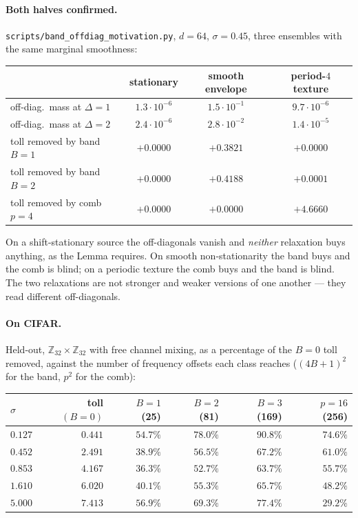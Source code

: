 \paragraph{Both halves confirmed.} \texttt{scripts/band\_offdiag\_motivation.py},
$d=64$, $\sigma=0.45$, three ensembles with the same marginal smoothness:

\begin{center}
\begin{tabular}{lccc}
\hline
 & stationary & smooth envelope & period-$4$ texture\\
\hline
off-diag.\ mass at $\Delta=1$ & $1.3\cdot10^{-6}$ & $1.5\cdot10^{-1}$ & $9.7\cdot10^{-6}$\\
off-diag.\ mass at $\Delta=2$ & $2.4\cdot10^{-6}$ & $2.8\cdot10^{-2}$ & $1.4\cdot10^{-5}$\\
toll removed by band $B=1$ & $+0.0000$ & $\mathbf{+0.3821}$ & $+0.0000$\\
toll removed by band $B=2$ & $+0.0000$ & $\mathbf{+0.4188}$ & $+0.0001$\\
toll removed by comb $p=4$ & $+0.0000$ & $+0.0000$ & $\mathbf{+4.6660}$\\
\hline
\end{tabular}
\end{center}

On a shift-stationary source the off-diagonals vanish and \emph{neither} relaxation buys
anything, as the Lemma requires. On smooth non-stationarity the band buys and the comb
is blind; on a periodic texture the comb buys and the band is blind. The two relaxations
are not stronger and weaker versions of one another --- they read different off-diagonals.

\paragraph{On CIFAR.} Held-out, $\mathbb{Z}_{32}\times\mathbb{Z}_{32}$ with free channel
mixing, as a percentage of the $B=0$ toll removed, against the number of frequency
offsets each class reaches ($(4B+1)^{2}$ for the band, $p^{2}$ for the comb):

\begin{center}
\begin{tabular}{lrrrrr}
\hline
$\sigma$ & toll $(B{=}0)$ & $B{=}1$ (25) & $B{=}2$ (81) & $B{=}3$ (169) & $p{=}16$ (256)\\
\hline
$0.127$ & $0.441$ & $54.7\%$ & $78.0\%$ & $90.8\%$ & $74.6\%$\\
$0.452$ & $2.491$ & $38.9\%$ & $56.5\%$ & $67.2\%$ & $61.0\%$\\
$0.853$ & $4.167$ & $36.3\%$ & $52.7\%$ & $63.7\%$ & $55.7\%$\\
$1.610$ & $6.020$ & $40.1\%$ & $55.3\%$ & $65.7\%$ & $48.2\%$\\
$5.000$ & $7.413$ & $56.9\%$ & $69.3\%$ & $77.4\%$ & $29.2\%$\\
\hline
\end{tabular}
\end{center}

